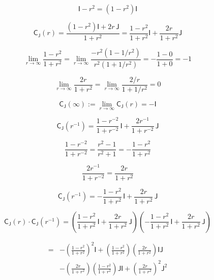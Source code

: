 \documentclass[12pt]{article}
\begin{document}
\begin{equation}
\mathsf{I}-r^2=(1-r^2)\mathsf{I}
\end{equation}

\begin{equation}
\mathsf{C}_{\mathsf{J}}(r)
=\frac{(1-r^2)\mathsf{I}+2r\,\mathsf{J}}{1+r^2}
=\frac{1-r^2}{1+r^2}\mathsf{I}+\frac{2r}{1+r^2}\mathsf{J}
\end{equation}

\begin{equation}
\lim_{r\to\infty}\frac{1-r^2}{1+r^2}
=\lim_{r\to\infty}\frac{-r^2(1-1/r^2)}{r^2(1+1/r^2)}
=-\frac{1-0}{1+0}
=-1
\end{equation}

\begin{equation}
\lim_{r\to\infty}\frac{2r}{1+r^2}
=\lim_{r\to\infty}\frac{2/r}{1+1/r^2}
=0
\end{equation}

\begin{equation}
\mathsf{C}_{\mathsf{J}}(\infty):=\lim_{r\to\infty}\mathsf{C}_{\mathsf{J}}(r)=-\mathsf{I}
\end{equation}

\begin{equation}
\mathsf{C}_{\mathsf{J}}(r^{-1})=\frac{1-r^{-2}}{1+r^{-2}}\,\mathsf{I}+\frac{2r^{-1}}{1+r^{-2}}\,\mathsf{J}
\end{equation}

\begin{equation}
\frac{1-r^{-2}}{1+r^{-2}}=\frac{r^2-1}{r^2+1}=-\frac{1-r^2}{1+r^2}
\end{equation}

\begin{equation}
\frac{2r^{-1}}{1+r^{-2}}=\frac{2r}{1+r^2}
\end{equation}

\begin{equation}
\mathsf{C}_{\mathsf{J}}(r^{-1})=-\frac{1-r^2}{1+r^2}\,\mathsf{I}+\frac{2r}{1+r^2}\,\mathsf{J}
\end{equation}

\begin{equation}
\mathsf{C}_{\mathsf{J}}(r)\cdot\mathsf{C}_{\mathsf{J}}(r^{-1})
=
\left(\frac{1-r^2}{1+r^2}\,\mathsf{I}+\frac{2r}{1+r^2}\,\mathsf{J}\right)
\left(-\frac{1-r^2}{1+r^2}\,\mathsf{I}+\frac{2r}{1+r^2}\,\mathsf{J}\right)
\end{equation}

\begin{equation}
\begin{split}
={}&
-\left(\frac{1-r^2}{1+r^2}\right)^{\!2}\mathsf{I}
+\left(\frac{1-r^2}{1+r^2}\right)\!\left(\frac{2r}{1+r^2}\right)\mathsf{I}\mathsf{J}\\
&-\left(\frac{2r}{1+r^2}\right)\!\left(\frac{1-r^2}{1+r^2}\right)\mathsf{J}\mathsf{I}
+\left(\frac{2r}{1+r^2}\right)^{\!2}\mathsf{J}^2
\end{split}
\end{equation}
\end{document}
